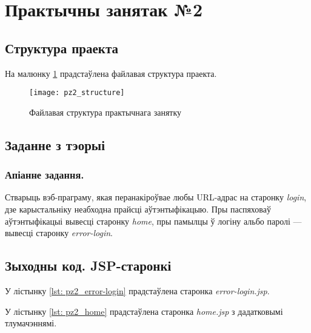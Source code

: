 \section{Практычны занятак №2}

\subsection{Структура праекта}

На малюнку \ref{img: pz2} прадстаўлена файлавая структура праекта.

\begin{figure}[h!]
    \centering
    \texttt{[image: pz2\_structure]}
    \caption{Файлавая структура практычнага занятку}
    \label{img: pz2} 
\end{figure}

\vspace{-\baselineskip}
\subsection{Заданне з тэорыі}

\subsubsection{Апіанне задання.}

Стварыць вэб-праграму, якая перанакіроўвае любы URL-адрас
на старонку \textit{login}, дзе карыстальніку неабходна
прайсці аўтэнтыфікацыю. Пры паспяховаў аўтэнтыфікацыі вывесці
старонку \textit{home}, пры памылцы ў логіну альбо паролі ---
вывесці старонку \textit{error-login}.

\subsection{Зыходны код. JSP-старонкі}

У лістынку \ref{lst: pz2_error-login} прадстаўлена старонка
\textit{error-login.jsp}.



У лістынку \ref{lst: pz2_home} прадстаўлена старонка
\textit{home.jsp} з дадатковымі тлумачэннямі.



